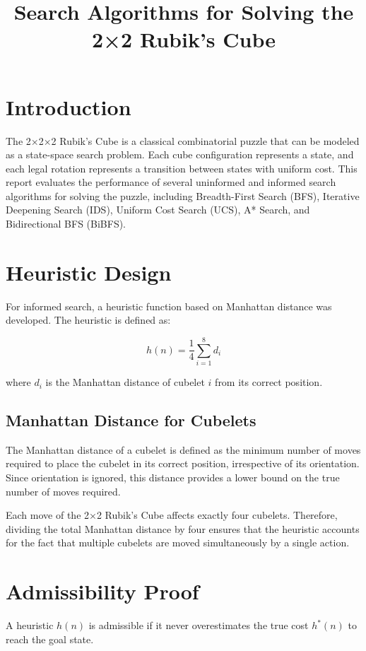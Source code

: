 \documentclass[12pt]{article}
\title{Search Algorithms for Solving the 2×2 Rubik’s Cube}
\author{}
\date{}
\begin{document}
\maketitle

\section{Introduction}
The 2×2×2 Rubik’s Cube is a classical combinatorial puzzle that can be modeled as a state-space search problem. Each cube configuration represents a state, and each legal rotation represents a transition between states with uniform cost. This report evaluates the performance of several uninformed and informed search algorithms for solving the puzzle, including Breadth-First Search (BFS), Iterative Deepening Search (IDS), Uniform Cost Search (UCS), A* Search, and Bidirectional BFS (BiBFS).

\section{Heuristic Design}
For informed search, a heuristic function based on Manhattan distance was developed. The heuristic is defined as:

\[
h(n) = \frac{1}{4} \sum_{i=1}^{8} d_i
\]

where \( d_i \) is the Manhattan distance of cubelet \( i \) from its correct position.

\subsection{Manhattan Distance for Cubelets}
The Manhattan distance of a cubelet is defined as the minimum number of moves required to place the cubelet in its correct position, irrespective of its orientation. Since orientation is ignored, this distance provides a lower bound on the true number of moves required.

Each move of the 2×2 Rubik’s Cube affects exactly four cubelets. Therefore, dividing the total Manhattan distance by four ensures that the heuristic accounts for the fact that multiple cubelets are moved simultaneously by a single action.

\section{Admissibility Proof}
A heuristic \( h(n) \) is admissible if it never overestimates the true cost \( h^*(n) \) to reach the goal state.
\end{document}
